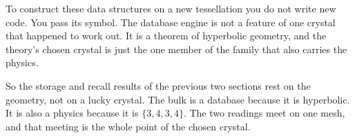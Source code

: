 \begin{result}
To construct these data structures on a new tessellation you do not write new code. You pass its symbol. The database engine is not a feature of one crystal that happened to work out. It is a theorem of hyperbolic geometry, and the theory's chosen crystal is just the one member of the family that also carries the physics.
\end{result}

So the storage and recall results of the previous two sections rest on the geometry, not on a lucky crystal. The bulk is a database because it is hyperbolic. It is also a physics because it is $\{3,4,3,4\}$. The two readings meet on one mesh, and that meeting is the whole point of the chosen crystal.
